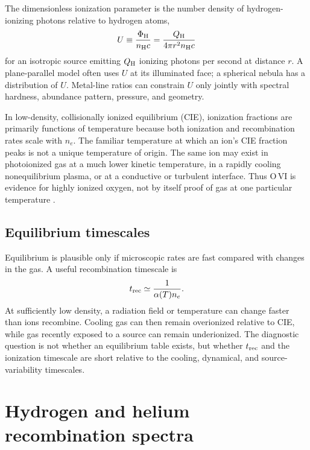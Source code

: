 The dimensionless ionization parameter is the number density of hydrogen-ionizing
photons relative to hydrogen atoms,
\begin{equation}
 U\equiv\frac{\Phi_{\rm H}}{n_{\rm H}c}
 =\frac{Q_{\rm H}}{4\pi r^2n_{\rm H}c}
 \label{eq:ionization-parameter}
\end{equation}
for an isotropic source emitting $Q_{\rm H}$ ionizing photons per second at distance
$r$.  A plane-parallel model often uses $U$ at its illuminated face; a spherical
nebula has a distribution of $U$.  Metal-line ratios can constrain $U$ only jointly
with spectral hardness, abundance pattern, pressure, and geometry.

In low-density, collisionally ionized equilibrium (CIE), ionization fractions are
primarily functions of temperature because both ionization and recombination rates
scale with $n_e$.  The familiar temperature at which an ion's CIE fraction peaks is
not a unique temperature of origin.  The same ion may exist in photoionized gas at a
much lower kinetic temperature, in a rapidly cooling nonequilibrium plasma, or at a
conductive or turbulent interface.  Thus O\,VI is evidence for highly ionized oxygen,
not by itself proof of gas at one particular temperature
\citep{GnatSternberg2007,TumlinsonPeeplesWerk2017}.

\subsection{Equilibrium timescales}

Equilibrium is plausible only if microscopic rates are fast compared with changes in
the gas.  A useful recombination timescale is
\begin{equation}
 t_{\rm rec}\simeq\frac{1}{\alpha(T)n_e}.
 \label{eq:recombination-timescale}
\end{equation}
At sufficiently low density, a radiation field or temperature can change faster than
ions recombine.  Cooling gas can then remain overionized relative to CIE, while gas
recently exposed to a source can remain underionized.  The diagnostic question is not
whether an equilibrium table exists, but whether $t_{\rm rec}$ and the ionization
timescale are short relative to the cooling, dynamical, and source-variability
timescales.

\section{Hydrogen and helium recombination spectra}

